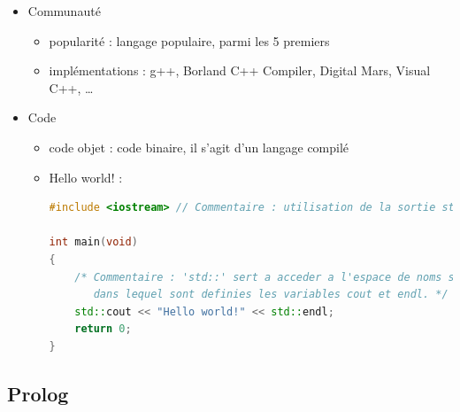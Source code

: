\begin{itemize}
\begin{itemize}
	\end{itemize}
\item Communauté
	\begin{itemize}
	\item popularité : langage populaire, parmi les 5 premiers
	\item implémentations : g++, Borland C++ Compiler, Digital Mars, Visual C++, …\\
	\end{itemize}
\item Code
	\begin{itemize}
	\item code objet : code binaire, il s'agit d'un langage compilé
	\item Hello world! :
\begin{lstlisting}[language=c++]
#include <iostream> // Commentaire : utilisation de la sortie standard

int main(void)
{
    /* Commentaire : 'std::' sert a acceder a l'espace de noms std,
       dans lequel sont definies les variables cout et endl. */
    std::cout << "Hello world!" << std::endl;
    return 0;
}
\end{lstlisting}
	\end{itemize}
\end{itemize}

\newpage

\subsection{Prolog}

